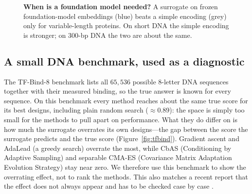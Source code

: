 \documentclass{article}
\begin{document}
\begin{figure}[t]
\centering
{}
\caption{\textbf{When is a foundation model needed?} A surrogate on frozen foundation-model
embeddings (blue) beats a simple encoding (grey) only for variable-length proteins. On short
DNA the simple encoding is stronger; on 300-bp DNA the two are about the same.}
\label{fig:decode}
\end{figure}

\subsection{A small DNA benchmark, used as a diagnostic}

The TF-Bind-8 benchmark \citep{barrera2016tfbind, trabucco2022designbench} lists all
$65{,}536$ possible 8-letter DNA sequences together with their measured binding, so the true
answer is known for every sequence. On this benchmark every method reaches about the same
true score for its best designs, including plain random search ($\approx0.89$): the space is
simply too small for the methods to pull apart on performance. What they do differ on is how
much the surrogate overrates its own designs---the gap between the score the surrogate
predicts and the true score (Figure~\ref{fig:tfbind}). Gradient ascent and AdaLead (a
greedy search) overrate the most, while CbAS (Conditioning by Adaptive Sampling) and
separable CMA-ES (Covariance Matrix Adaptation Evolution Strategy) stay near zero. We
therefore use this benchmark to show the overrating effect, not to rank the methods. This
also matches a recent report that the effect does not always appear and has to be checked
case by case \citep{yang2025taco}.
\end{document}

